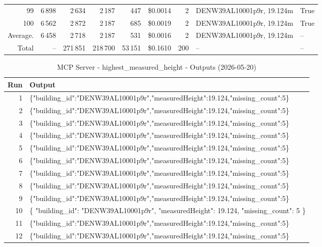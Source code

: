 \documentclass[a4paper,11pt]{article}
\begin{document}
\begin{table}[ht]
\begin{tabular}{r r r r r r r p{3cm} l}
99 & 6\,898 & 2\,634 & 2\,187 & 447 & \$0.0014 & 2 & DENW39AL10001p9r, 19.124m & True \\
100 & 6\,562 & 2\,872 & 2\,187 & 685 & \$0.0019 & 2 & DENW39AL10001p9r, 19.124m & True \\
\hline
Average. & 6\,458 & 2\,718 & 2\,187 & 531 & \$0.0016 & 2 & DENW39AL10001p9r, 19.124m & -- \\
Total & -- & 271\,851 & 218\,700 & 53\,151 & \$0.1610 & 200 & -- & -- \\
\hline
\end{tabular}
\end{table}

\clearpage

\begin{table}[ht]
\centering
\scriptsize
\caption{MCP Server - highest\_measured\_height - Outputs (2026-05-20)}
\label{tab:mcp\_highest\_measured\_height\_outputs\_2026-05-20}
\begin{tabular}{r p{12cm}}
\hline
Run & Output \\
\hline
1 & \{"building\_id":"DENW39AL10001p9r","measuredHeight":19.124,"missing\_count":5\} \\
2 & \{"building\_id":"DENW39AL10001p9r","measuredHeight":19.124,"missing\_count":5\} \\
3 & \{"building\_id":"DENW39AL10001p9r","measuredHeight":19.124,"missing\_count":5\} \\
4 & \{"building\_id":"DENW39AL10001p9r","measuredHeight":19.124,"missing\_count":5\} \\
5 & \{"building\_id":"DENW39AL10001p9r","measuredHeight":19.124,"missing\_count":5\} \\
6 & \{"building\_id":"DENW39AL10001p9r","measuredHeight":19.124,"missing\_count":5\} \\
7 & \{"building\_id":"DENW39AL10001p9r","measuredHeight":19.124,"missing\_count":5\} \\
8 & \{"building\_id":"DENW39AL10001p9r","measuredHeight":19.124,"missing\_count":5\} \\
9 & \{"building\_id":"DENW39AL10001p9r","measuredHeight":19.124,"missing\_count":5\} \\
10 & \{
  "building\_id": "DENW39AL10001p9r",
  "measuredHeight": 19.124,
  "missing\_count": 5
\} \\
11 & \{"building\_id":"DENW39AL10001p9r","measuredHeight":19.124,"missing\_count":5\} \\
12 & \{"building\_id":"DENW39AL10001p9r","measuredHeight":19.124,"missing\_count":5\} \\

\end{tabular}
\end{table}
\end{document}

